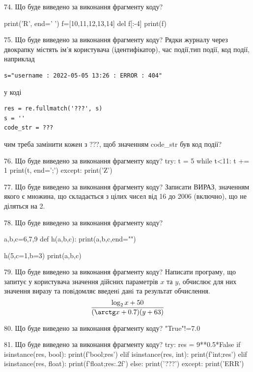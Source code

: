 \documentclass[11pt]{article}
\begin{document}
74. Що буде виведено за виконання фрагменту коду?

print('R', end=' ')
f=[10,11,12,13,14]
del f[:-4]
print(f)



75. Що буде виведено за виконання фрагменту коду?
Рядки журналу через двокрапку містять ім'я користувача (ідентифікатор), час події,тип події, код події, наприклад
\begin{verbatim}
s="username : 2022-05-05 13:26 : ERROR : 404"
\end{verbatim}
у коді 
\begin{verbatim}
res = re.fullmatch('???', s) 
s = ''
code_str = ??? 
\end{verbatim}
чим треба замінити кожен з ???, щоб значенням code\_str був код події? 




76. Що буде виведено за виконання фрагменту коду?
try:
    t = 5
    while t<11:
        t += 1
    print(t, end=';')
except:
    print('Z')


77. Що буде виведено за виконання фрагменту коду?
Записати ВИРАЗ, значенням якого є множина, що складається з цілих чисел від 16 до 2006 (включно), що не діляться на 2.

78. Що буде виведено за виконання фрагменту коду?

a,b,c=6,7,9
def h(a,b,c):
    print(a,b,c,end="")

h(5,c=1,b=3)
print(a,b,c)



79. Що буде виведено за виконання фрагменту коду?
Написати програму, що запитує у користувача значення дійсних параметрів $x$ та $y$, обчислює для них значення виразу та повiдомляє введенi данi та результат обчислення.
$$\frac{\log_{2} x + 50}{(\arctg x + 0.7) (y + 63)}$$ 



80. Що буде виведено за виконання фрагменту коду?
"True"!=7.0

81. Що буде виведено за виконання фрагменту коду?
try:
    res = 9**0.5*False
    if isinstance(res, bool):
        print(f'bool;{res}')
    elif isinstance(res, int):
        print(f'int;{res}')
    elif isinstance(res, float):
        print(f'float;{res:.2f}')
    else:
        print('???')
except:
    print('ERR')
\end{document}
